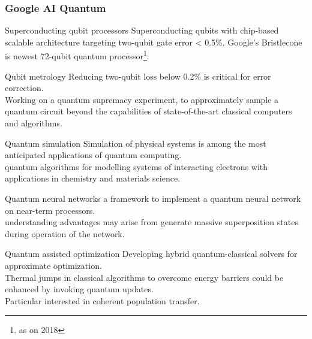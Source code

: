 \documentclass[xcolor=x11names,table]{beamer}
\begin{document}
	
	\begin{frame}[allowframebreaks]
		\frametitle{Google AI Quantum}
		\begin{block}{Superconducting qubit processors}
			Superconducting qubits with chip-based scalable architecture targeting two-qubit gate error < 0.5\%. Google's Bristlecone is newest 72-qubit quantum processor\footnote{as on 2018}.
		\end{block}
		\begin{block}{Qubit metrology}
			Reducing two-qubit loss below 0.2\% is critical for error correction.
			\\ Working on a quantum supremacy experiment, to approximately sample a quantum circuit beyond the capabilities of state-of-the-art classical computers and algorithms.
		\end{block}
		\begin{block}{Quantum simulation}
			Simulation of physical systems is among the most anticipated applications of quantum computing.
			\\ quantum algorithms for modelling systems of interacting electrons with applications in chemistry and materials science.
		\end{block}
		\begin{block}{Quantum neural networks}
			a framework to implement a quantum neural network on near-term processors.
			\\ understanding advantages may arise from generate massive superposition states during operation of the network.
		\end{block}
		\begin{block}{Quantum assisted optimization}
			Developing hybrid quantum-classical solvers for approximate optimization.
			\\ Thermal jumps in classical algorithms to overcome energy barriers could be enhanced by invoking quantum updates.
			\\ Particular interested in coherent population transfer.
		\end{block}
	\end{frame}
	
	
	
\end{document}
